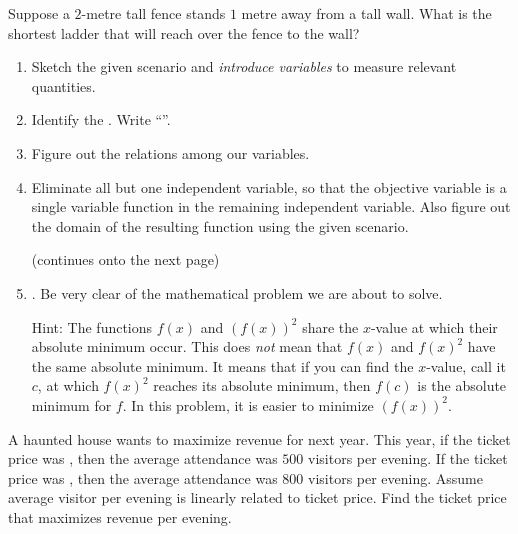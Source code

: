\documentclass[../main.tex]{subfiles}
\begin{document}
\begin{exercise} \label{ex:optimization-ladder}
  Suppose a \(2\)-metre tall fence stands \(1\) metre away from a tall wall.  What is the shortest ladder that will reach over the fence to the wall?

  \begin{enumerate}[wide, noitemsep, label=(Step~\arabic*).]
    \item Sketch the given scenario and \emph{introduce variables} to measure relevant quantities.



    \item Identify the . Write ``''.


    \item Figure out the relations among our variables.


    \item Eliminate all but one independent variable, so that the objective variable is a single variable function in the remaining independent variable. Also figure out the domain of the resulting function using the given scenario.

      \blanks*

      \vfill{}{\footnotesize (continues onto the next page)} \clearpage

    \item {}. Be very clear of the mathematical problem we are about to solve.

      {\footnotesize Hint: The functions \(f(x)\) and \((f(x))^{2}\) share the \(x\)-value at which their absolute minimum occur.  This does \emph{not} mean that \(f(x)\) and \(f(x)^{2}\) have the same absolute minimum.  It means that if you can find the \(x\)-value, call it \(c\), at which \(f(x)^{2}\) reaches its absolute minimum, then \(f(c)\) is the absolute minimum for \(f\). In this problem, it is easier to minimize \((f(x))^{2}\).}

      \blanks*
  \end{enumerate}
\end{exercise}
\clearpage

\begin{exercise}
  A haunted house wants to maximize revenue for next year. This year, if the ticket price was , then the average attendance was \(500\) visitors per evening. If the ticket price was , then the average attendance was \(800\) visitors per evening.  Assume average visitor per evening is linearly related to ticket price. Find the ticket price that maximizes revenue per evening.

  \blanks*
\end{exercise}
\clearpage
\end{document}

